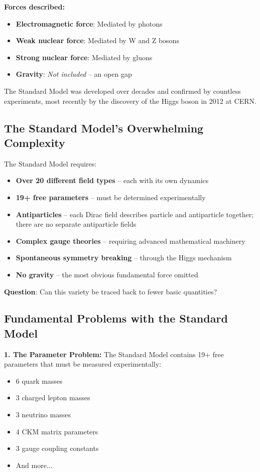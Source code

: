 	\textbf{Forces described:}
	\begin{itemize}
		\item \textbf{Electromagnetic force}: Mediated by photons
		\item \textbf{Weak nuclear force}: Mediated by W and Z bosons
		\item \textbf{Strong nuclear force}: Mediated by gluons
		\item \textbf{Gravity}: \emph{Not included} -- an open gap
	\end{itemize}
	
	The Standard Model was developed over decades and confirmed by countless experiments, most recently by the discovery of the Higgs boson in 2012 at CERN.
	
	\subsection{The Standard Model's Overwhelming Complexity}
	
	\begin{tcolorbox}[colback=red!5!white,colframe=red!75!black,title=Complexity of the Standard Model]
		The Standard Model requires:
		\begin{itemize}
			\item \textbf{Over 20 different field types} -- each with its own dynamics
			\item \textbf{19+ free parameters} -- must be determined experimentally
			\item \textbf{Antiparticles} -- each Dirac field describes particle and antiparticle together; there are no separate antiparticle fields
			\item \textbf{Complex gauge theories} -- requiring advanced mathematical machinery
			\item \textbf{Spontaneous symmetry breaking} -- through the Higgs mechanism
			\item \textbf{No gravity} -- the most obvious fundamental force omitted
		\end{itemize}
		
		\textbf{Question}: Can this variety be traced back to fewer basic quantities?
	\end{tcolorbox}
	
	\subsection{Fundamental Problems with the Standard Model}
	
	\textbf{1. The Parameter Problem:}
	The Standard Model contains 19+ free parameters that must be measured experimentally:
	\begin{itemize}
		\item 6 quark masses
		\item 3 charged lepton masses  
		\item 3 neutrino masses
		\item 4 CKM matrix parameters
		\item 3 gauge coupling constants
		\item And more...
	\end{itemize}
	
